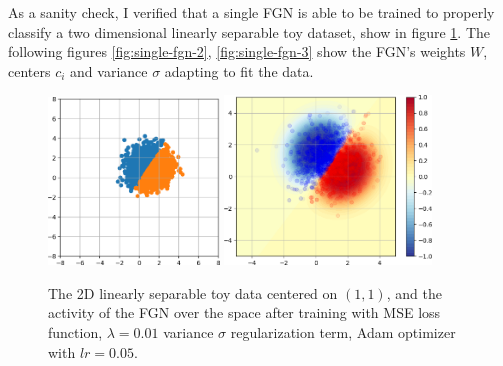 \documentclass[12pt,oneside]{CUNY_PhD}
\begin{document}
As a sanity check, I verified that a single FGN is able to be trained to properly classify a two dimensional linearly separable toy dataset, show in figure \ref{fig:single-fgn-1}. The following figures \ref{fig:single-fgn-2}, \ref{fig:single-fgn-3} show the FGN's weights $W$, centers $c_i$ and variance $\sigma$ adapting to fit the data.
\begin{figure}[!b]
    \centering
    \hspace{0.0\textwidth}
    \includegraphics[width=0.405\textwidth]{images/2D-single-neuron/2d-easy-data-cropped.png}
    \hspace{0.04\textwidth}
    \includegraphics[width=0.49\textwidth]{images/2D-single-neuron/2d-easy-trained-activity-cropped.png}
    \caption{The 2D linearly separable toy data centered on $(1,1)$, and the activity of the FGN over the space after training with MSE loss function, $\lambda=0.01$ variance $\sigma$ regularization term, Adam optimizer with $lr=0.05$.}
    \label{fig:single-fgn-1}
\end{figure}
\end{document}
